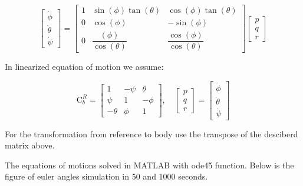 \begin{equation}
    \begin{bmatrix}
        \dot \phi \\
        \dot \theta \\
        \dot \psi
    \end{bmatrix} = \begin{bmatrix}
        1 & \sin(\phi)\tan(\theta) & \cos(\phi)\tan(\theta)\\
        0 & \cos(\phi) & -\sin(\phi) \\
        0 & \dfrac{(\phi)}{\cos(\theta)} & \dfrac{\cos(\phi)}{\cos(\theta)}
    \end{bmatrix} \begin{bmatrix}
        p \\q \\ r
    \end{bmatrix}
\end{equation}

In linearized equation of motion we assume:

\begin{equation}
    \boldsymbol{\mathrm{C}}_b^R = \begin{bmatrix}
        1 & -\psi & \theta \\
        \psi & 1 & -\phi \\
        -\theta & \phi & 1
    \end{bmatrix}, \quad \begin{bmatrix}
        p \\ q \\ r
    \end{bmatrix} = \begin{bmatrix}
        \dot \phi \\
        \dot \theta \\
        \dot \psi
    \end{bmatrix}
\end{equation}

For the transformation from reference to body use the transpose of the desciberd matrix above.


The equations of motions solved in MATLAB with ode45 function. Below is the figure of euler angles simulation in 50 and 1000 seconds.

